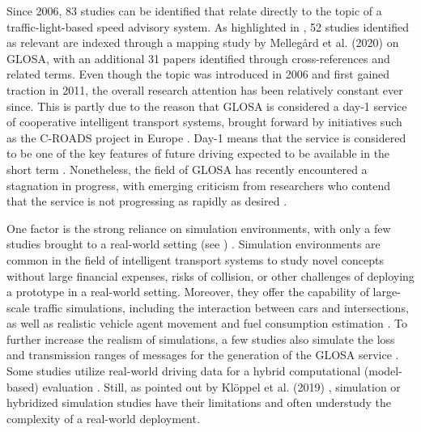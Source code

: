 Since 2006, 83 studies can be identified that relate directly to the topic of a traffic-light-based speed advisory system. As highlighted in , 52 studies identified as relevant are indexed through a mapping study by Mellegård et al. (2020) \cite{mellegard_day_2020} on GLOSA, with an additional 31 papers identified through cross-references and related terms. Even though the topic was introduced in 2006 and first gained traction in 2011, the overall research attention has been relatively constant ever since. This is partly due to the reason that GLOSA is considered a day-1 service of cooperative intelligent transport systems, brought forward by initiatives such as the C-ROADS project in Europe \cite{sharara_impact_2019}. Day-1 means that the service is considered to be one of the key features of future driving expected to be available in the short term \cite{mellegard_day_2020}. Nonetheless, the field of GLOSA has recently encountered a stagnation in progress, with emerging criticism from researchers who contend that the service is not progressing as rapidly as desired \cite{mellegard_day_2020, otto_framework_2023}.

One factor is the strong reliance on simulation environments, with only a few studies brought to a real-world setting (see ) \cite{mellegard_day_2020}. Simulation environments are common in the field of intelligent transport systems to study novel concepts without large financial expenses, risks of collision, or other challenges of deploying a prototype in a real-world setting. Moreover, they offer the capability of  large-scale traffic simulations, including the interaction between cars and intersections, as well as realistic vehicle agent movement and fuel consumption estimation \cite{kloeppel_performance_2019, pariota_green_2019}. To further increase the realism of simulations, a few studies also simulate the loss and transmission ranges of messages for the generation of the GLOSA service \cite{sharara_impact_2019}. Some studies utilize real-world driving data for a hybrid computational (model-based) evaluation \cite{raubitschek_predictive_2011, luo_green_2017, xie_dynamic_2021, bhattacharyya_assessing_2022}. Still, as pointed out by Klöppel et al. (2019) \cite{kloeppel_performance_2019}, simulation or hybridized simulation studies have their limitations and often understudy the complexity of a real-world deployment.

